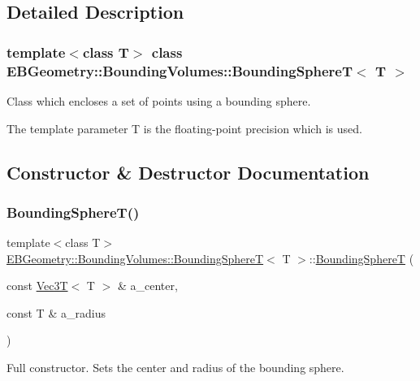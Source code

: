 \subsection{Detailed Description}
\subsubsection*{template$<$class T$>$\newline
class E\+B\+Geometry\+::\+Bounding\+Volumes\+::\+Bounding\+Sphere\+T$<$ T $>$}

Class which encloses a set of points using a bounding sphere. 

The template parameter T is the floating-\/point precision which is used. 

\subsection{Constructor \& Destructor Documentation}
\mbox{\label{classEBGeometry_1_1BoundingVolumes_1_1BoundingSphereT_a67800669cf2aee6493ea0da5439a34fd}} 
\subsubsection{\texorpdfstring{Bounding\+Sphere\+T()}{BoundingSphereT()}\hspace{0.1cm}{\footnotesize\ttfamily [1/4]}}
{\footnotesize\ttfamily template$<$class T$>$ \\
\hyperlink{classEBGeometry_1_1BoundingVolumes_1_1BoundingSphereT}{E\+B\+Geometry\+::\+Bounding\+Volumes\+::\+Bounding\+SphereT}$<$ T $>$\+::\hyperlink{classEBGeometry_1_1BoundingVolumes_1_1BoundingSphereT}{Bounding\+SphereT} (\begin{DoxyParamCaption}\item[{const \hyperlink{classVec3T}{Vec3T}$<$ T $>$ \&}]{a\+\_\+center,  }\item[{const T \&}]{a\+\_\+radius }\end{DoxyParamCaption})}



Full constructor. Sets the center and radius of the bounding sphere. 


